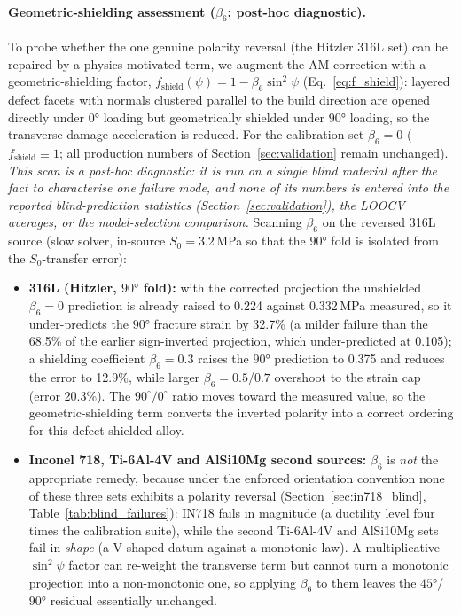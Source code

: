 \documentclass[12pt,a4paper,twocolumn]{article}
\begin{document}
\paragraph{Geometric-shielding assessment ($\beta_6$; post-hoc diagnostic).}
To probe whether the one genuine polarity reversal (the Hitzler 316L set) can be repaired by a physics-motivated term, we augment the AM correction with a geometric-shielding factor, $f_{\text{shield}}(\psi) = 1 - \beta_6 \sin^2\psi$ (Eq.~\eqref{eq:f_shield}): layered defect facets with normals clustered parallel to the build direction are opened directly under $\ang{0}$ loading but geometrically shielded under $\ang{90}$ loading, so the transverse damage acceleration is reduced. For the calibration set $\beta_6 = 0$ ($f_{\text{shield}} \equiv 1$; all production numbers of Section~\ref{sec:validation} remain unchanged). \emph{This scan is a post-hoc diagnostic: it is run on a single blind material after the fact to characterise one failure mode, and none of its numbers is entered into the reported blind-prediction statistics (Section~\ref{sec:validation}), the LOOCV averages, or the model-selection comparison.} Scanning $\beta_6$ on the reversed 316L source (slow solver, in-source $S_0 = 3.2$\,MPa so that the $\ang{90}$ fold is isolated from the $S_0$-transfer error):
\begin{itemize}
\item \textbf{316L (Hitzler, $\ang{90}$ fold):} with the corrected projection the unshielded $\beta_6 = 0$ prediction is already raised to 0.224 against 0.332\,MPa measured, so it under-predicts the $\ang{90}$ fracture strain by 32.7\% (a milder failure than the 68.5\% of the earlier sign-inverted projection, which under-predicted at 0.105); a shielding coefficient $\beta_6 = 0.3$ raises the $\ang{90}$ prediction to 0.375 and reduces the error to 12.9\%, while larger $\beta_6 = 0.5$/$0.7$ overshoot to the strain cap (error 20.3\%). The $90^\circ/0^\circ$ ratio moves toward the measured value, so the geometric-shielding term converts the inverted polarity into a correct ordering for this defect-shielded alloy.
\item \textbf{Inconel 718, Ti-6Al-4V and AlSi10Mg second sources:} $\beta_6$ is \emph{not} the appropriate remedy, because under the enforced orientation convention none of these three sets exhibits a polarity reversal (Section~\ref{sec:in718_blind}, Table~\ref{tab:blind_failures}): IN718 fails in magnitude (a ductility level four times the calibration suite), while the second Ti-6Al-4V and AlSi10Mg sets fail in \emph{shape} (a V-shaped datum against a monotonic law). A multiplicative $\sin^2\psi$ factor can re-weight the transverse term but cannot turn a monotonic projection into a non-monotonic one, so applying $\beta_6$ to them leaves the $\ang{45}$/$\ang{90}$ residual essentially unchanged.
\end{itemize}
\end{document}
